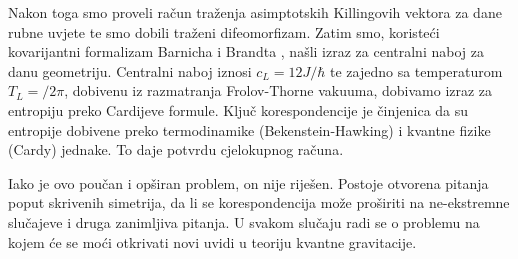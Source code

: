 Nakon toga smo proveli račun traženja asimptotskih Killingovih vektora za dane rubne uvjete te smo dobili traženi difeomorfizam. Zatim smo, koristeći kovarijantni formalizam Barnicha i Brandta \citep{Barnich:2001jy}, našli izraz za centralni naboj za danu geometriju. Centralni naboj iznosi $c_L=12J/\hbar$ te zajedno sa temperaturom $T_L=/2\pi$, dobivenu iz razmatranja Frolov-Thorne vakuuma, dobivamo izraz za entropiju preko Cardijeve formule. Ključ korespondencije je činjenica da su entropije dobivene preko termodinamike (Bekenstein-Hawking) i kvantne fizike (Cardy) jednake. To daje potvrdu cjelokupnog računa.

Iako je ovo poučan i opširan problem, on nije riješen. Postoje otvorena pitanja poput skrivenih simetrija, da li se korespondencija može proširiti na ne-ekstremne slučajeve i druga zanimljiva pitanja. U svakom slučaju radi se o problemu na kojem će se moći otkrivati novi uvidi u teoriju kvantne gravitacije. 



